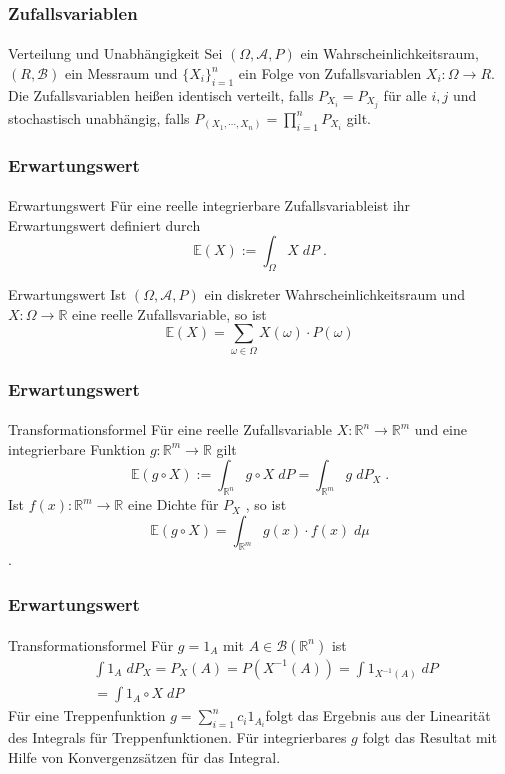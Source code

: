 \documentclass{beamer}
\begin{document}
\begin{frame}
    \frametitle{Zufallsvariablen}
\framesubtitle{}
\begin{block}{Verteilung und Unabhängigkeit}
Sei $(\Omega, \mathcal{A}, P)$ ein Wahrscheinlichkeitsraum, $(R, \mathcal{B})$ ein Messraum  und
 $\{X_i\}_{i=1}^n$ ein Folge von Zufallsvariablen   $X_i :  \Omega \to R$.
Die Zufallsvariablen heißen identisch verteilt, falls
 $P_{X_i} = P_{X_j}$ für alle $i,j$  und
stochastisch unabhängig, falls
 $P_{(X_1, \cdots ,X_n)} = \prod_{i=1}^n P_{X_i}$ gilt. 
\end{block}
 \end{frame}



\begin{frame}
    \frametitle{Erwartungswert}
\framesubtitle{}
\begin{block}{Erwartungswert}
Für eine reelle integrierbare Zufallsvariableist ihr  Erwartungswert  definiert durch
$$ \mathbb{E} (X) := \int_{\Omega} X \; dP \; .$$
\end{block}
 \begin{block}{Erwartungswert}
Ist $(\Omega, \mathcal{A}, P)$ ein diskreter Wahrscheinlichkeitsraum und $X :\Omega \to \mathbb{R}$ eine reelle Zufallsvariable, so ist
$$ \mathbb{E} (X) = \sum_{\omega \in \Omega}  X(\omega) \cdot P(\omega)$$
\end{block}
 \end{frame}


\begin{frame}
    \frametitle{Erwartungswert}
\framesubtitle{}
\begin{block}{Transformationsformel}
Für eine reelle Zufallsvariable $X: \mathbb{R}^n \to \mathbb{R}^m$ und eine integrierbare Funktion $g:  \mathbb{R}^m \to \mathbb{R}$ gilt
$$ \mathbb{E} (g \circ X) := \int_{\mathbb{R}^n} g \circ X \; dP = \int_{\mathbb{R}^m}  g \; dP_X \;. $$
Ist $f(x) : \mathbb{R}^m \to \mathbb{R}$ eine Dichte für $P_X$ , so ist  
$$\mathbb{E} (g \circ X) =  \int_{\mathbb{R}^m} g(x) \cdot f(x) \; d\mu$$.
\end{block}
 \end{frame}

 \begin{frame}
    \frametitle{Erwartungswert}
\framesubtitle{}
\begin{block}{Transformationsformel}
Für $g = 1_A$ mit $A \in \mathcal{B}(\mathbb{R}^n)$ ist
\begin{align*}
& \int 1_A \; dP_X = P_X(A) = P(X^{-1} (A)) = \int 1_{X^{-1}(A)} \; dP \\
&= \int 1_{A} \circ X \; dP
\end{align*}
Für eine Treppenfunktion $g= \sum_{i= 1}^n c_i 1_{A_i} $folgt das Ergebnis aus der Linearität des Integrals  für Treppenfunktionen. Für integrierbares $g$ folgt das Resultat mit Hilfe von Konvergenzsätzen für das  Integral.
\end{block}
 \end{frame}
\end{document}
